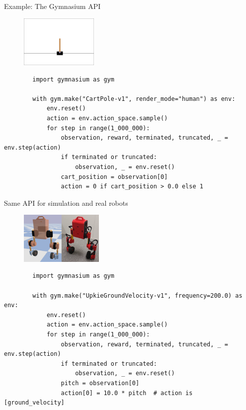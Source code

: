 \documentclass[10pt, aspectratio=1610]{beamer}
\begin{document}
\begin{frame}[fragile]{Example: The Gymnasium API}
    \begin{figure}
        \includegraphics[height=2.5cm]{figures/cart-pole.png}
    \end{figure}
    \begin{verbatim}
        import gymnasium as gym

        with gym.make("CartPole-v1", render_mode="human") as env:
            env.reset()
            action = env.action_space.sample()
            for step in range(1_000_000):
                observation, reward, terminated, truncated, _ = env.step(action)
                if terminated or truncated:
                    observation, _ = env.reset()
                cart_position = observation[0]
                action = 0 if cart_position > 0.0 else 1
    \end{verbatim}
\end{frame}

\begin{frame}[fragile]{Same API for simulation and real robots}
    \begin{figure}
        \includegraphics[height=2.5cm]{figures/upkie-sim-real.png}
    \end{figure}
    \begin{verbatim}
        import gymnasium as gym

        with gym.make("UpkieGroundVelocity-v1", frequency=200.0) as env:
            env.reset()
            action = env.action_space.sample()
            for step in range(1_000_000):
                observation, reward, terminated, truncated, _ = env.step(action)
                if terminated or truncated:
                    observation, _ = env.reset()
                pitch = observation[0]
                action[0] = 10.0 * pitch  # action is [ground_velocity]
    \end{verbatim}
\end{frame}
\end{document}
